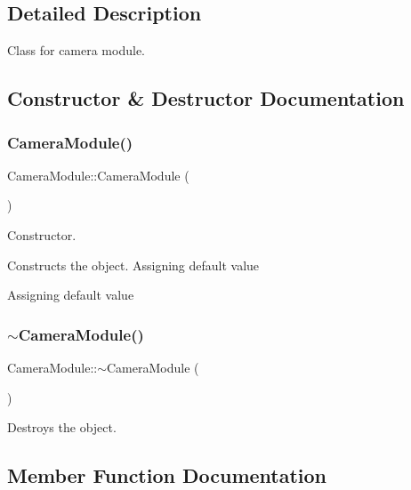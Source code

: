 \subsection{Detailed Description}
Class for camera module. 

\subsection{Constructor \& Destructor Documentation}
\mbox{\label{class_camera_module_aee54ebbc4116cf63c1e9a95987d779a0}} 
\subsubsection{\texorpdfstring{Camera\+Module()}{CameraModule()}}
{\footnotesize\ttfamily Camera\+Module\+::\+Camera\+Module (\begin{DoxyParamCaption}{ }\end{DoxyParamCaption})}



Constructor. 

Constructs the object. Assigning default value

Assigning default value \mbox{\label{class_camera_module_a04bd90027432f057e9b12d1c601c8fcb}} 
\subsubsection{\texorpdfstring{$\sim$\+Camera\+Module()}{~CameraModule()}}
{\footnotesize\ttfamily Camera\+Module\+::$\sim$\+Camera\+Module (\begin{DoxyParamCaption}{ }\end{DoxyParamCaption})}



Destroys the object. 



\subsection{Member Function Documentation}
\mbox{\label{class_camera_module_a42b107b119e5e9aa18286bfb1f926d7a}} 
